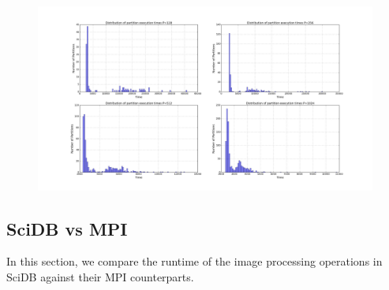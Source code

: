 \documentclass[tog]{acmsiggraph}
\begin{document}
\begin{figure}[htp]
\label{fig:scaling}\includegraphics[width=\textwidth]{figures/partition_dist}
\end{figure}

\subsection{SciDB vs MPI}\label{sec:clusterexp}
In this section, we compare the runtime of the image processing operations in
SciDB against their MPI counterparts.
\end{document}
